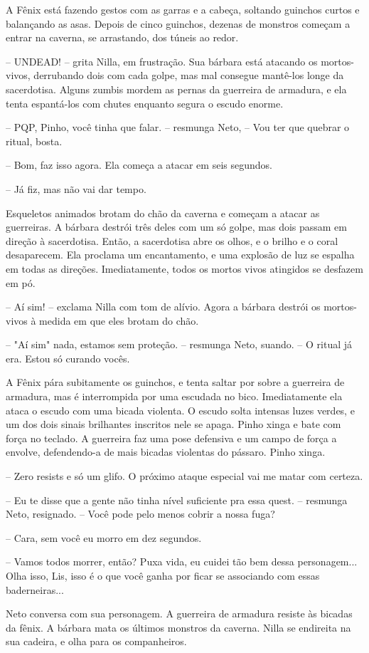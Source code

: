 A Fênix está fazendo gestos com as garras e a cabeça, soltando guinchos curtos e balançando as asas.
Depois de cinco guinchos, dezenas de monstros começam a entrar na caverna, se arrastando, dos túneis ao redor.

-- UNDEAD! -- grita Nilla, em frustração. Sua bárbara está atacando os mortos-vivos, derrubando dois com cada golpe, 
mas mal consegue mantê-los longe da sacerdotisa. 
Alguns zumbis mordem as pernas da guerreira de armadura, e ela tenta espantá-los com chutes enquanto segura o escudo enorme.

-- PQP, Pinho, você tinha que falar. -- resmunga Neto, -- Vou ter que quebrar o ritual, bosta.

-- Bom, faz isso agora. Ela começa a atacar em seis segundos.

-- Já fiz, mas não vai dar tempo.

Esqueletos animados brotam do chão da caverna e começam a atacar as guerreiras. A bárbara destrói três deles com um só golpe,
mas dois passam em direção à sacerdotisa. 
Então, a sacerdotisa abre os olhos, e o brilho e o coral
desaparecem. Ela proclama um encantamento, e uma explosão de luz se espalha em todas as direções. Imediatamente,
todos os mortos vivos atingidos se desfazem em pó.

-- Aí sim! -- exclama Nilla com tom de alívio. Agora a bárbara destrói os mortos-vivos à medida em que eles brotam do chão.

-- "Aí sim" nada, estamos sem proteção. -- resmunga Neto, suando. -- O ritual já era. Estou só curando vocês.

A Fênix pára subitamente os guinchos, e tenta saltar por sobre a guerreira de armadura, mas é interrompida por uma escudada no bico.
Imediatamente ela ataca o escudo com uma bicada violenta. O escudo solta intensas luzes verdes, e um dos dois sinais
brilhantes inscritos nele se apaga. Pinho xinga e bate com força no teclado. A guerreira faz uma pose defensiva e um campo de força a envolve,
defendendo-a de mais bicadas violentas do pássaro. Pinho xinga.

-- Zero resists e só um glifo. O próximo ataque especial vai me matar com certeza.

-- Eu te disse que a gente não tinha nível suficiente pra essa quest. -- resmunga Neto, resignado. -- Você pode pelo menos cobrir a nossa fuga?

-- Cara, sem você eu morro em dez segundos.

-- Vamos todos morrer, então? Puxa vida, eu cuidei tão bem dessa personagem... Olha isso, Lis, isso é o que você ganha por ficar se associando
com essas baderneiras...

Neto conversa com sua personagem. A guerreira de armadura resiste às bicadas da fênix. A bárbara mata os últimos monstros da caverna.
Nilla se endireita na sua cadeira, e olha para os companheiros.
